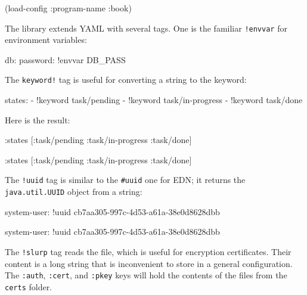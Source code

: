 
\begin{clojure}
(load-config {:program-name :book})
\end{clojure}

The library extends YAML with several tags. One is the familiar \verb|!envvar| for environment variables:


\begin{yaml}
db:
  password: !envvar DB_PASS
\end{yaml}

\noindent
The \verb|keyword!| tag is useful for converting a string to the keyword:

\begin{yaml}
states:
  - !keyword task/pending
  - !keyword task/in-progress
  - !keyword task/done
\end{yaml}

\noindent
Here is the result:

\ifnarrow

\begin{clojure}
{:states [:task/pending
          :task/in-progress
          :task/done]}
\end{clojure}

\else

\begin{clojure}
{:states [:task/pending :task/in-progress :task/done]}
\end{clojure}

\fi

The \verb|!uuid| tag is similar to the \verb|#uuid| one for EDN; it returns the \verb|java.util.UUID| object from a string:

\ifnarrow

\begin{yaml}
system-user: !uuid
    cb7aa305-997c-4d53-a61a-38e0d8628dbb
\end{yaml}

\else

\begin{yaml}
system-user: !uuid cb7aa305-997c-4d53-a61a-38e0d8628dbb
\end{yaml}

\fi

The \verb|!slurp| tag reads the file, which is useful for encryption certificates. Their content is a long string that is inconvenient to store in a general configuration. The \verb|:auth|, \verb|:cert|, and \verb|:pkey| keys will hold the contents of the files from the \verb|certs| folder.

